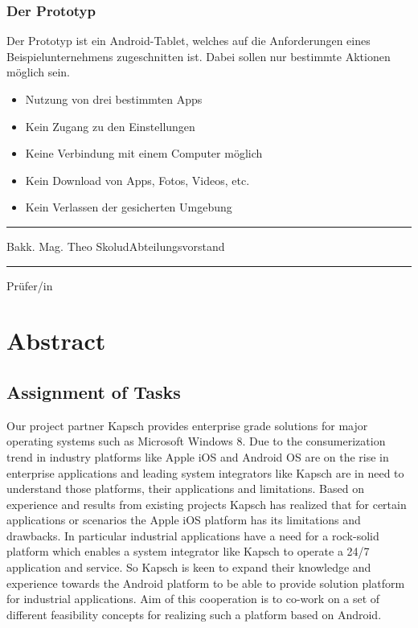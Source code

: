 \subsection*{Der Prototyp}
Der Prototyp ist ein Android-Tablet, welches auf die Anforderungen eines Beispielunternehmens zugeschnitten ist. Dabei sollen nur bestimmte Aktionen möglich sein. 
\begin{itemize}
	\item Nutzung von drei bestimmten Apps
	\item Kein Zugang zu den Einstellungen
	\item Keine Verbindung mit einem Computer möglich
	\item Kein Download von Apps, Fotos, Videos, etc.
	\item Kein Verlassen der gesicherten Umgebung
\end{itemize}

\noindent
\par
\vspace{20mm}
\noindent

\parbox{5cm}{\centering\hrule\medskip Bakk. Mag. Theo Skolud\newline Abteilungsvorstand}

\noindent
\par
\vspace{20mm}
\noindent

\parbox{5cm}{\centering\hrule\medskip Prüfer/in}

\newpage

\chapter*{Abstract}
\section*{Assignment of Tasks}
Our project partner Kapsch provides enterprise grade solutions for major operating systems such as Microsoft Windows 8. Due to the consumerization trend in industry platforms like Apple iOS and Android OS are on the rise in enterprise applications and leading system integrators like Kapsch are in need to understand those platforms, their applications and limitations. Based on experience and results from existing projects Kapsch has realized that for certain applications or scenarios the Apple iOS platform has its limitations and drawbacks. In particular industrial applications have a need for a rock-solid platform which enables a system integrator like Kapsch to operate a 24/7 application and service. So Kapsch is keen to expand their knowledge and experience towards the Android platform to be able to provide solution platform for industrial applications.
Aim of this cooperation is to co-work on a set of different feasibility concepts for realizing such a platform based on Android.

